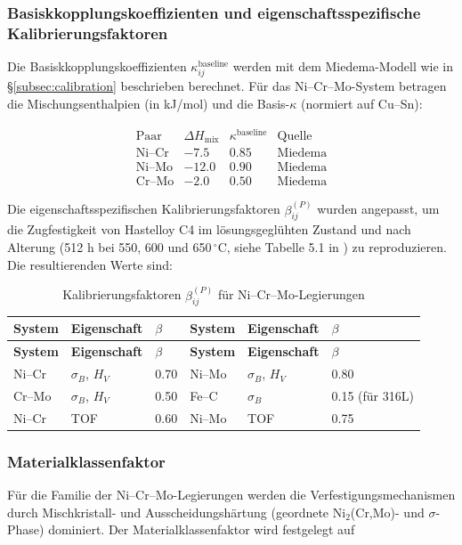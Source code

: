 \documentclass[12pt,a4paper]{article}
\begin{document}
	\subsubsection{Basiskkopplungskoeffizienten und eigenschaftsspezifische Kalibrierungsfaktoren}
	Die Basiskkopplungskoeffizienten $\kappa_{ij}^{\text{baseline}}$ werden mit dem Miedema-Modell wie in \S\ref{subsec:calibration} beschrieben berechnet. Für das Ni–Cr–Mo-System betragen die Mischungsenthalpien (in kJ/mol) und die Basis-$\kappa$ (normiert auf Cu–Sn):
	
	\[
	\begin{array}{lccc}
		\text{Paar} & \Delta H_{\text{mix}} & \kappa^{\text{baseline}} & \text{Quelle} \\
		\hline
		\text{Ni–Cr} & -7.5 & 0.85 & \text{Miedema} \\
		\text{Ni–Mo} & -12.0 & 0.90 & \text{Miedema} \\
		\text{Cr–Mo} & -2.0 & 0.50 & \text{Miedema}
	\end{array}
	\]
	
	Die eigenschaftsspezifischen Kalibrierungsfaktoren $\beta_{ij}^{(P)}$ wurden angepasst, um die Zugfestigkeit von Hastelloy C4 im lösungsgeglühten Zustand und nach Alterung (512 h bei 550, 600 und 650\,\(^{\circ}\)C, siehe Tabelle 5.1 in \cite{dis2025}) zu reproduzieren. Die resultierenden Werte sind:
	
	\begin{longtable}{p{1.5cm} p{1.5cm} p{1.5cm} p{1.5cm} p{1.5cm} p{1.5cm}}
		\caption{Kalibrierungsfaktoren $\beta_{ij}^{(P)}$ für Ni–Cr–Mo-Legierungen}\label{tab:nicrmo_beta}\\
		\toprule
		\textbf{System} & \textbf{Eigenschaft} & \(\beta\) & \textbf{System} & \textbf{Eigenschaft} & \(\beta\) \\
		\midrule
		\endfirsthead
		\toprule
		\textbf{System} & \textbf{Eigenschaft} & \(\beta\) & \textbf{System} & \textbf{Eigenschaft} & \(\beta\) \\
		\midrule
		\endhead
		Ni–Cr   & \(\sigma_B\), \(H_V\) & 0.70 & Ni–Mo   & \(\sigma_B\), \(H_V\) & 0.80 \\
		Cr–Mo   & \(\sigma_B\), \(H_V\) & 0.50 & Fe–C    & \(\sigma_B\)        & 0.15 (für 316L) \\
		Ni–Cr   & TOF              & 0.60 & Ni–Mo   & TOF              & 0.75 \\
		\bottomrule
	\end{longtable}
	
	\subsubsection{Materialklassenfaktor}
	Für die Familie der Ni–Cr–Mo-Legierungen werden die Verfestigungsmechanismen durch Mischkristall- und Ausscheidungshärtung (geordnete Ni$_2$(Cr,Mo)- und $\sigma$-Phase) dominiert. Der Materialklassenfaktor wird festgelegt auf
	
\end{document}
